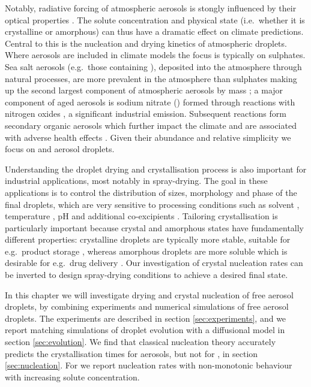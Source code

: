 \documentclass[11pt,twoside]{report}
\begin{document}
Notably, radiative forcing of atmospheric aerosols is stongly influenced by their optical properties \cite{HodasACP2015,CotterellACP2017}.
The solute concentration and physical state (i.e.\ whether it is crystalline or amorphous) can thus have a dramatic effect on climate predictions.
Central to this is the nucleation and drying kinetics of atmospheric droplets.
Where aerosols are included in climate models the focus is typically on sulphates.
Sea salt aerosols (e.g.\ those containing ), deposited into the atmosphere through natural processes, are more prevalent in the atmosphere than sulphates making up the second largest component of atmospheric aerosols by mass \cite{KeeneJAS1998}; a major component of aged  aerosols is sodium nitrate () formed through reactions with nitrogen oxides \cite{TolockaJPCA2004}, a significant industrial emission.
Subsequent reactions form secondary organic aerosols which further impact the climate \cite{ScottACP2014,PoschlCR2015} and are associated with adverse health effects \cite{PoschlCR2015}.
Given their abundance and relative simplicity we focus on  and  aerosol droplets.

Understanding the droplet drying and crystallisation process is also important for industrial applications, most notably in spray-drying.
The goal in these applications is to control the distribution of sizes, morphology and phase of the final droplets, which are very sensitive to processing conditions such as solvent \cite{CarverIECR2012,LintingreSM2016}, temperature \cite{IveyAST2018,YouDT2014,LinPT2015}, pH \cite{YuJPS2002,DubbiniIJP2014} and additional co-excipients \cite{ZhongAP2018,NandiyantoAPT2011,LyuJCG2017}.
Tailoring crystallisation is particularly important because crystal and amorphous states have fundamentally different properties: crystalline droplets are typically more stable, suitable for e.g.\ product storage \cite{VehringJAS2007,CostantinoJPS1998}, whereas amorphous droplets are more soluble which is desirable for e.g.\ drug delivery \cite{AmstadJPCB2016,BroughIJP2013}.
Our investigation of crystal nucleation rates can be inverted to design spray-drying conditions to achieve a desired final state.

In this chapter we will investigate drying and crystal nucleation of free aerosol droplets, by combining experiments and numerical simulations of free aerosol droplets.
The experiments are described in section \ref{sec:experiments}, and we report matching simulations of droplet evolution with a diffusional model in section \ref{sec:evolution}.
We find that classical nucleation theory accurately predicts the crystallisation times for  aerosols, but not for , in section \ref{sec:nucleation}.
For  we report nucleation rates with non-monotonic behaviour with increasing solute concentration.
\end{document}
